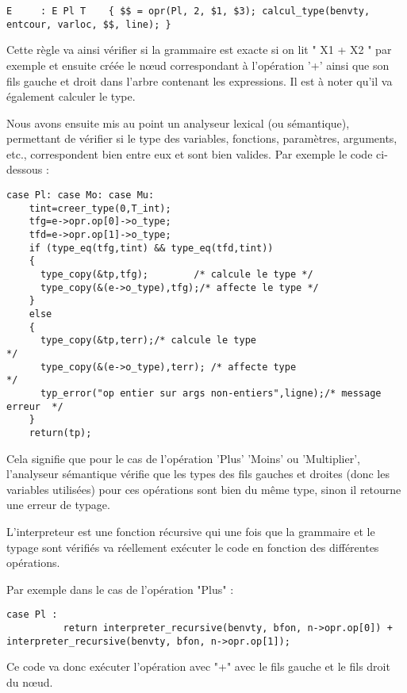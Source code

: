 \documentclass{article}
\begin{document}
\begin{lstlisting}
E     : E Pl T    { $$ = opr(Pl, 2, $1, $3); calcul_type(benvty, entcour, varloc, $$, line); }
\end{lstlisting}

Cette règle va ainsi vérifier si la grammaire est exacte si on lit " X1 + X2 " par exemple et ensuite créée le nœud correspondant à l'opération '+' ainsi que son fils gauche et droit dans l'arbre contenant les expressions. Il est à noter qu'il va également calculer le type.

\smallbreak
Nous avons ensuite mis au point un analyseur lexical (ou sémantique), permettant de vérifier si le type des variables, fonctions, paramètres, arguments, etc., correspondent bien entre eux et sont bien valides.
Par exemple le code ci-dessous :

\begin{lstlisting}
case Pl: case Mo: case Mu:
    tint=creer_type(0,T_int);
    tfg=e->opr.op[0]->o_type;
    tfd=e->opr.op[1]->o_type;
    if (type_eq(tfg,tint) && type_eq(tfd,tint))
    {
      type_copy(&tp,tfg);        /* calcule le type */
      type_copy(&(e->o_type),tfg);/* affecte le type */
    }
    else
    {
      type_copy(&tp,terr);/* calcule le type                               */
      type_copy(&(e->o_type),terr); /* affecte type                         */
      typ_error("op entier sur args non-entiers",ligne);/* message erreur  */
    }
    return(tp);
\end{lstlisting}

Cela signifie que pour le cas de l'opération 'Plus' 'Moins' ou 'Multiplier', l'analyseur sémantique vérifie que les types des fils gauches et droites (donc les variables utilisées) pour ces opérations sont bien du même type, sinon il retourne une erreur de typage.

\smallbreak
L'interpreteur est une fonction récursive qui une fois que la grammaire et le typage sont vérifiés va réellement exécuter le code en fonction des différentes opérations.

Par exemple dans le cas de l'opération "Plus" :

\begin{lstlisting}
case Pl :
          return interpreter_recursive(benvty, bfon, n->opr.op[0]) + interpreter_recursive(benvty, bfon, n->opr.op[1]);
\end{lstlisting}

Ce code va donc exécuter l'opération avec "+" avec le fils gauche et le fils droit du nœud.
\end{document}
